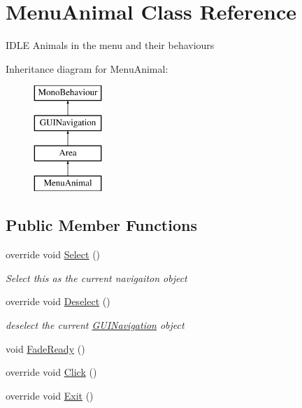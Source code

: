 \hypertarget{class_menu_animal}{}\section{Menu\+Animal Class Reference}
\label{class_menu_animal}


I\+D\+LE Animals in the menu and their behaviours  


Inheritance diagram for Menu\+Animal\+:\begin{figure}[H]
\begin{center}
\leavevmode
\includegraphics[height=4.000000cm]{class_menu_animal}
\end{center}
\end{figure}
\subsection*{Public Member Functions}
\begin{DoxyCompactItemize}
\item 
override void \mbox{\hyperlink{class_menu_animal_ae910dac4feb11d1d3c911bd1823075cc}{Select}} ()
\begin{DoxyCompactList}\small\item\em Select this as the current navigaiton object \end{DoxyCompactList}\item 
override void \mbox{\hyperlink{class_menu_animal_af9e4ef2370ac2f5e83444e62dacfda0e}{Deselect}} ()
\begin{DoxyCompactList}\small\item\em deselect the current \mbox{\hyperlink{class_g_u_i_navigation}{G\+U\+I\+Navigation}} object \end{DoxyCompactList}\item 
void \mbox{\hyperlink{class_menu_animal_afe23546cf23f5cf911e6f1655b9a5dbd}{Fade\+Ready}} ()
\item 
override void \mbox{\hyperlink{class_menu_animal_abb7cd3e0be5e041e4d5df6b44c94b7e4}{Click}} ()
\item 
override void \mbox{\hyperlink{class_menu_animal_af53d9975856687f698eccf7d45c83a24}{Exit}} ()
\end{DoxyCompactItemize}
